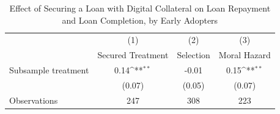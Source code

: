 \begin{table}[htbp]\centering
\def\sym#1{\ifmmode^{#1}\else\(^{#1}\)\fi}
\caption{Effect of Securing a Loan with Digital Collateral on Loan Repayment and Loan Completion, by Early Adopters\label{LASMH\_complete\_earlyadopt\_ITT\_110}}
\begin{tabular}{l*{3}{c}}
\toprule
                    &\multicolumn{1}{c}{(1)}&\multicolumn{1}{c}{(2)}&\multicolumn{1}{c}{(3)}\\
                    &\multicolumn{1}{c}{Secured Treatment}&\multicolumn{1}{c}{Selection}&\multicolumn{1}{c}{Moral Hazard}\\
\midrule
Subsample treatment &        0.14\sym{**} &       -0.01         &        0.15\sym{**} \\
                    &      (0.07)         &      (0.05)         &      (0.07)         \\
\midrule
Observations        &         247         &         308         &         223         \\
\bottomrule
\end{tabular}
\end{table}

